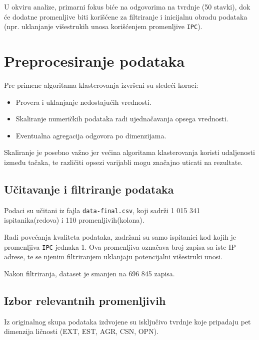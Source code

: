\documentclass[12pt,a4paper]{article}
\begin{document}
U okviru analize, primarni fokus biće na odgovorima na tvrdnje (50 stavki), dok će dodatne promenljive biti korišćene za filtriranje i inicijalnu obradu podataka (npr. uklanjanje višestrukih unosa korišćenjem promenljive \texttt{IPC}).



\section{Preprocesiranje podataka}

Pre primene algoritama klasterovanja izvršeni su sledeći koraci:

\begin{itemize}
    \item Provera i uklanjanje nedostajućih vrednosti.
    \item Skaliranje numeričkih podataka radi ujednačavanja opsega vrednosti.
    \item Eventualna agregacija odgovora po dimenzijama.
    
\end{itemize}

Skaliranje je posebno važno jer većina algoritama klasterovanja koristi udaljenosti između tačaka, te različiti opsezi varijabli mogu značajno uticati na rezultate.



\subsection{Učitavanje i filtriranje podataka}

Podaci su učitani iz fajla \texttt{data-final.csv}, koji sadrži 1 015 341 ispitanika(redova) i 110 promenljivih(kolona).

Radi povećanja kvaliteta podataka, zadržani su samo ispitanici kod kojih je promenljiva \texttt{IPC} jednaka 1. Ova promenljiva označava broj zapisa sa iste IP adrese, te se njenim filtriranjem uklanjaju potencijalni višestruki unosi.

Nakon filtriranja, dataset je smanjen na 696 845 zapisa.

\subsection{Izbor relevantnih promenljivih}

Iz originalnog skupa podataka izdvojene su isključivo tvrdnje koje pripadaju pet dimenzija ličnosti (EXT, EST, AGR, CSN, OPN).
\end{document}
